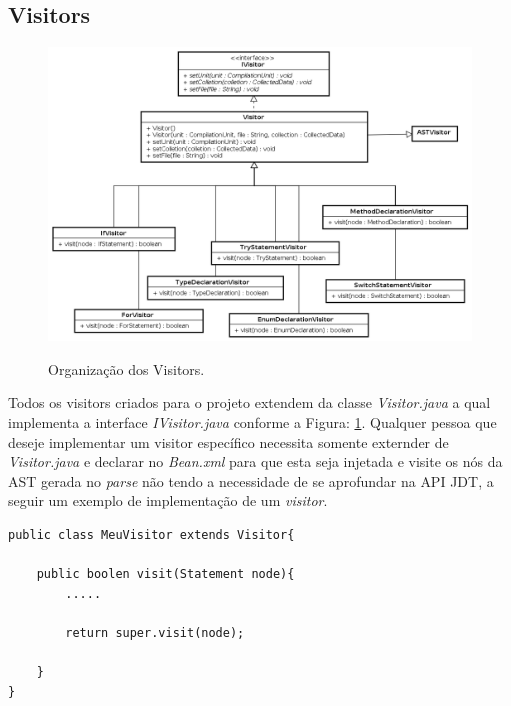 \subsection{Visitors}
\begin{figure}[h]
\center
\includegraphics[scale=0.5]{Imagens/Visitors}
\label{fig:arqVisitor}
\caption{Organização dos Visitors.}
\end{figure}

Todos os visitors criados para o projeto extendem da classe \textit{Visitor.java} a qual implementa a interface \textit{IVisitor.java} conforme a Figura: \ref{fig:arqVisitor}. Qualquer pessoa que deseje implementar um visitor específico necessita somente externder de \textit{Visitor.java}  e declarar no \textit{Bean.xml} para que esta seja injetada e visite os nós da \acs{AST} gerada no \textit{parse} não tendo a necessidade de se aprofundar na \acs{API} \acs{JDT}, a seguir um exemplo de implementação de um \textit{visitor}.\\

\begin{lstlisting}
public class MeuVisitor extends Visitor{

	public boolen visit(Statement node){
		.....
		
		return super.visit(node);
		
	}
}

\end{lstlisting}


